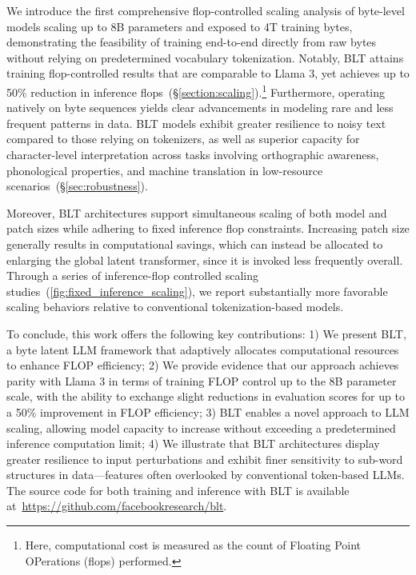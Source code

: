 We introduce the first comprehensive flop-controlled scaling analysis of byte-level models scaling up to 8B parameters and exposed to 4T training bytes, demonstrating the feasibility of training end-to-end directly from raw bytes without relying on predetermined vocabulary tokenization. Notably, {\textsc BLT} attains training flop-controlled results that are comparable to Llama 3, yet achieves up to 50\% reduction in inference flops~(\S\ref{section:scaling}).\footnote{Here, computational cost is measured as the count of Floating Point OPerations (flops) performed.} Furthermore, operating natively on byte sequences yields clear advancements in modeling rare and less frequent patterns in data. {\textsc BLT} models exhibit greater resilience to noisy text compared to those relying on tokenizers, as well as superior capacity for character-level interpretation across tasks involving orthographic awareness, phonological properties, and machine translation in low-resource scenarios~(\S\ref{sec:robustness}). 

Moreover, {\textsc BLT} architectures support simultaneous scaling of both model and patch sizes while adhering to fixed inference flop constraints. Increasing patch size generally results in computational savings, which can instead be allocated to enlarging the global latent transformer, since it is invoked less frequently overall. Through a series of inference-flop controlled scaling studies~(\autoref{fig:fixed_inference_scaling}), we report substantially more favorable scaling behaviors relative to conventional tokenization-based models.

To conclude, this work offers the following key contributions: 1) We present {\textsc BLT}, a byte latent LLM framework that adaptively allocates computational resources to enhance FLOP efficiency; 2) We provide evidence that our approach achieves parity with Llama 3 in terms of training FLOP control up to the 8B parameter scale, with the ability to exchange slight reductions in evaluation scores for up to a 50\% improvement in FLOP efficiency; 3) {\textsc BLT} enables a novel approach to LLM scaling, allowing model capacity to increase without exceeding a predetermined inference computation limit; 4) We illustrate that {\textsc BLT} architectures display greater resilience to input perturbations and exhibit finer sensitivity to sub-word structures in data—features often overlooked by conventional token-based LLMs. The source code for both training and inference with {\textsc BLT} is available at~\url{https://github.com/facebookresearch/blt}.

